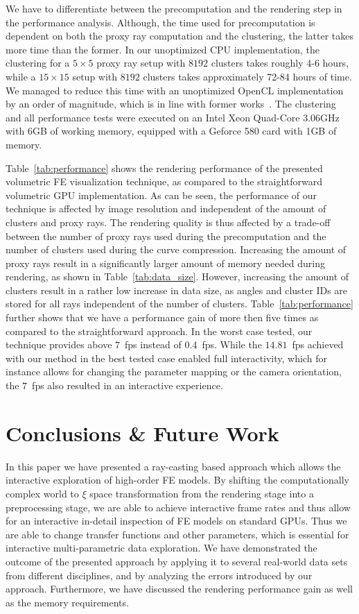 \documentclass[journal]{vgtc}                %
\begin{document}
We have to differentiate between the precomputation and the rendering step in the performance analysis. Although, the time used for precomputation is dependent on both the proxy ray computation and the clustering, the latter takes more time than the former. In our unoptimized CPU implementation, the clustering for a $5\times5$ proxy ray setup with $8192$ clusters takes roughly 4-6 hours, while a $15\times15$ setup with $8192$ clusters takes approximately 72-84 hours of time. We managed to reduce this time with an unoptimized OpenCL implementation by an order of magnitude, which is in line with former works~\cite{mess10gpuclustering}. The clustering and all performance tests were executed on an Intel Xeon Quad-Core 3.06GHz with 6GB of working memory, equipped with a Geforce 580 card with 1GB of memory.

Table~\ref{tab:performance} shows the rendering performance of the presented volumetric FE visualization technique, as compared to the straightforward volumetric GPU implementation. As can be seen, the performance of our technique is affected by image resolution and independent of the amount of clusters and proxy rays. The rendering quality is thus affected by a trade-off between the number of proxy rays used during the precomputation and the number of clusters used during the curve compression. Increasing the amount of proxy rays result in a significantly larger amount of memory needed during rendering, as shown in Table~\ref{tab:data_size}. However, increasing the amount of clusters result in a rather low increase in data size, as angles and cluster IDs are stored for all rays independent of the number of clusters. Table~\ref{tab:performance} further shows that we have a performance gain of more then five times as compared to the straightforward approach. In the worst case tested, our technique provides above $7$~fps instead of $0.4$~fps. While the $14.81$~fps achieved with our method in the best tested case enabled full interactivity, which for instance allows for changing the parameter mapping or the camera orientation, the $7$~fps also resulted in an interactive experience.



\section{Conclusions \& Future Work}\label{sec:conclusions}
In this paper we have presented a ray-casting based approach which allows the interactive exploration of high-order FE models. By shifting the computationally complex world to $\xi$ space transformation from the rendering stage into a preprocessing stage, we are able to achieve interactive frame rates and thus allow for an interactive in-detail inspection of FE models on standard GPUs. Thus we are able to change transfer functions and other parameters, which is essential for interactive multi-parametric data exploration. We have demonstrated the outcome of the presented approach by applying it to several real-world data sets from different disciplines, and by analyzing the errors introduced by our approach. Furthermore, we have discussed the rendering performance gain as well as the memory requirements.
\end{document}

